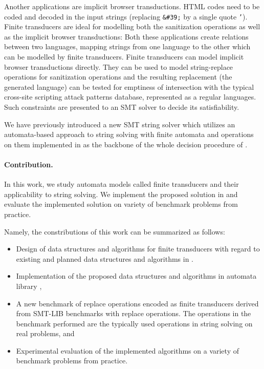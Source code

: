 Another applications are implicit browser transductions.
HTML codes need to be coded and decoded in the input strings (replacing \texttt{\&\#39;} by a single quote \texttt{'}).
Finite transducers are ideal for modelling both the sanitization operations as well as the implicit browser transductions:
Both these applications create relations between two languages, mapping strings from one language to the other which can be modelled by finite transducers.
Finite transducers can model implicit browser transductions directly.
They can be used to model string-replace operations for sanitization operations and the resulting replacement (the generated language) can be tested for emptiness of intersection with the typical cross-site scripting attack patterns database, represented as a regular languages.
Such constraints are presented to an SMT solver to decide its satisfiability.

We have previously introduced a new SMT string solver \noodler which utilizes an automata-based approach to string solving with finite automata and operations on them implemented in \mata as the backbone of the whole decision procedure of \noodler.

\paragraph{Contribution.}
In this work, we study automata models called finite transducers and their applicability to string solving. We implement the proposed solution in \mata and evaluate the implemented solution on variety of benchmark problems from practice.

Namely, the constributions of this work can be summarized as follows:
\begin{itemize}
  \item Design of data structures and algorithms for finite transducers with regard to existing and planned data structures and algorithms in \mata.
  \item Implementation of the proposed data structures and algorithms in automata library \mata,
  \item A new benchmark of replace operations encoded as finite transducers derived from SMT-LIB benchmarks with replace operations. The operations in the benchmark performed are the typically used operations in string solving on real problems, and
  \item Experimental evaluation of the implemented algorithms on a variety of benchmark problems from practice.
\end{itemize}

